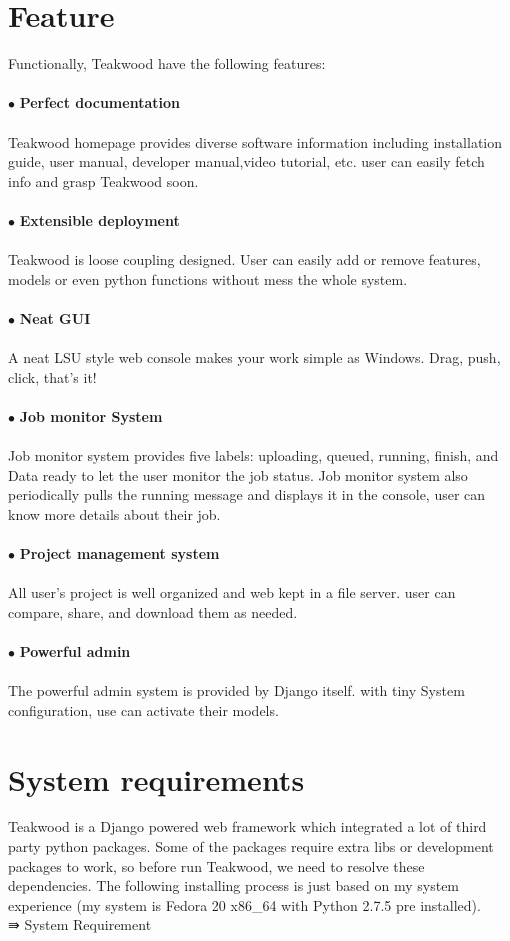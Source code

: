 \section{Feature}
Functionally, Teakwood have the following features:\\
\\
$\bullet$ \textbf{Perfect documentation}\\
\\
Teakwood homepage provides diverse software information including installation guide, user manual, developer manual,video tutorial, etc. user can easily fetch info and grasp Teakwood soon.\\
\\
$\bullet$ \textbf{Extensible deployment}\\
\\
Teakwood is loose coupling designed. User can easily add or remove features, models or even python functions without mess the whole system.\\
\\
$\bullet$ \textbf{Neat GUI}\\
\\
A neat LSU style web console makes your work simple as Windows. Drag, push, click, that's it!\\
\\
$\bullet$ \textbf{Job monitor System}\\
\\
Job monitor system provides five labels: uploading, queued, running, finish, and Data ready to let the user monitor the job status. Job monitor system also periodically pulls the running message and displays it in the console, user can know more details about their job.\\
\\
$\bullet$ \textbf{Project management system}\\
\\
All user's project is well organized and web kept in a file server. user can compare, share, and download them as needed.\\
\\
$\bullet$ \textbf{Powerful admin}\\
\\
The powerful admin system is provided by Django itself. with tiny System configuration, use can activate their models.

\section{System requirements}
Teakwood is a Django powered web framework which integrated a lot of third party python packages. Some of the packages require extra libs or development packages to work, so before run Teakwood, we need to resolve these dependencies. The following installing process is just based on my system experience (my system is Fedora 20 x86_64 with Python 2.7.5 pre installed).
\\
⇛ System Requirement

